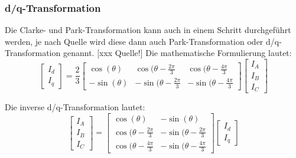 \subsubsection*{d/q-Transformation} 
Die Clarke- und Park-Transformation kann auch in einem Schritt durchgeführt werden, je nach Quelle wird diese dann auch Park-Transformation oder d/q-Transformation genannt. [xxx Quelle!] 
Die mathematische Formulierung lautet:
\begin{equation}\label{dqTrafo}
\left[
\begin{array}{c}
I_d \\ 
I_q
\end{array} 
\right]
= \frac{2}{3}
\left[
\begin{array}{ccc}
\cos (\theta) & \cos (\theta-\frac{2\pi}{3} & \cos (\theta-\frac{4\pi}{3} \\ 
-\sin (\theta) & -\sin (\theta-\frac{2\pi}{3} & -\sin (\theta-\frac{4\pi}{3}
\end{array} 
\right] 
\left[
\begin{array}{c}
I_A \\ 
I_B \\
I_C
\end{array} 
\right]
\end{equation}

Die inverse d/q-Transformation lautet:
\begin{equation}\label{invdqTrafo}
\left[
\begin{array}{c}
I_A \\ 
I_B \\
I_C
\end{array} 
\right]
=
\left[
\begin{array}{cc}
\cos (\theta) & -\sin (\theta) \\
\cos (\theta-\frac{2\pi}{3} & -\sin (\theta-\frac{2\pi}{3} \\
\cos (\theta-\frac{4\pi}{3} & -\sin (\theta-\frac{4\pi}{3} 
\end{array} 
\right] 
\left[
\begin{array}{c}
I_d \\ 
I_q
\end{array} 
\right]
\end{equation}


